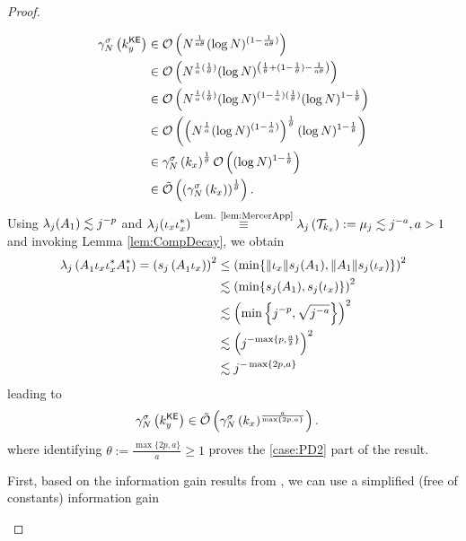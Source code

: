 \begin{theorem}
\begin{proof}
\begin{description}[style=multiline, leftmargin=3em,font=\normalfont]
\begin{subequations}
    \begin{align}
\gamma^{\sigma}_N\left(k^{{\textsf{KE}}}_{y}\right) 
& \in {\mathcal{O}} \left({N}^{\frac{1}{a\theta}}(\log N)^{(1
-\frac{1}{a\theta})}\right) \\
& \in {\mathcal{O}} \left({N}^{\frac{1}{a}(\frac{1}{\theta})}(\log N)^{\left(\frac{1}{\theta}+(1-\frac{1}{\theta})
-\frac{1}{a \theta}\right)}\right) \\
& \in {\mathcal{O}} \left({N}^{\frac{1}{a}(\frac{1}{\theta})}(\log N)^{(1
-\frac{1}{a})(\frac{1}{\theta})}(\log N)^{1-\frac{1}{\theta}}\right) \\
& \in {\mathcal{O}} \left(\left({N}^{\frac{1}{a}}(\log N)^{(1
-\frac{1}{a})}\right)^\frac{1}{\theta} (\log N)^{1-\frac{1}{\theta}}\right)\\
& \in \gamma^{\sigma}_N\left(k_{x}\right)^\frac{1}{\theta}{\mathcal{O}} \left( (\log N)^{1-\frac{1}{\theta}}\right) \\
& \in \tilde{\mathcal{O}} \left(\left(\gamma^{\sigma}_N\left(k_{x}\right)\right)^\frac{1}{\theta}\right).
\end{align}
\end{subequations}
Using $\lambda_j(A_1)\lesssim j^{-p}$ and $\lambda_j(\iota_x\iota_x^*)\overset{\textnormal{Lem. \ref{lem:MercerApp}}}{\equiv}\lambda_j\left(\mathcal{T}_{k_x}\right):=\mu_j\lesssim j^{-a}, a>1$  and invoking Lemma \ref{lem:CompDecay}, we obtain 
\begin{align}
\lambda_j\left({{A}^{}_1} \iota_x\iota_x^* {{A}^{*}_1}\right) = \left(s_j\left({{A}^{}_1} \iota_x\right)\right)^2 &  \leq  \left(\min\{\|\iota_x\|s_j(A_1),\|A_1\|s_j(\iota_x)\}\right)^2\\
&  \lesssim \left(\min\{s_j(A_1),s_j(\iota_x)\}\right)^2 \\
&  \lesssim \left(\min\left\{j^{-{p}},\sqrt{j^{-{a}}}\right\}\right)^2 \\
&  \lesssim \left(j^{-{\max\{p,{\frac{a}{2}}\}}}\right)^2\\
     & \lesssim  {j^{-\max\{2p,a\}}}
\end{align}
leading to
\begin{align}
    \gamma^{\sigma}_N\left(k^{{\textsf{KE}}}_{y}\right) & \in \tilde{\mathcal{O}} \left(\gamma^{\sigma}_N\left(k_{x}\right)^\frac{a}{\max\{2p,a\}}\right).
\end{align}
where identifying $\theta := \frac{\max\{2p,a\}}{a} \geq 1$ proves the \ref{case:PD2} part of the result.
    \item[\ref{case:ED2}{(\txt{Exp})}]  
First, based on the information gain results from \cite[Corollary 1]{pmlr-v130-vakili21a}, we can use a simplified (free of constants) information gain 

\end{description}
\end{proof}
\end{theorem}
